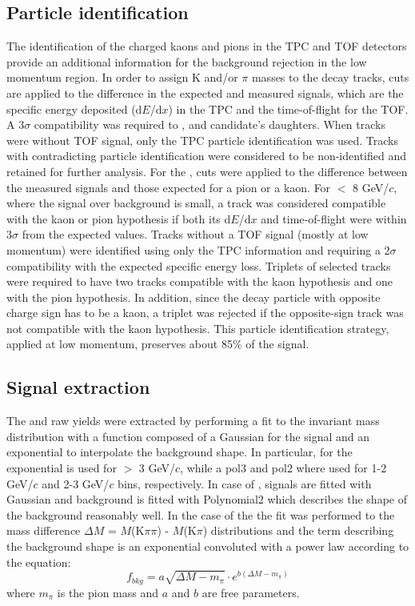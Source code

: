 \subsection{Particle identification}
\label{sec:pid_sel}
The identification of the charged kaons and pions in the TPC and TOF detectors provide an additional information for the background rejection in the low momentum region. In order to assign K and/or $\pi$ masses to the decay tracks, cuts are applied to the difference in the expected and measured signals, which are the specific energy deposited (d$E$/d$x$) in the TPC and the time-of-flight for the TOF. A 3$\sigma$ compatibility was required to \Dzero, \Dstar and \Dplus candidate's daughters. When tracks were without TOF signal, only the TPC particle identification was used. Tracks with contradicting particle identification were considered to be non-identified and retained for further analysis. 
For the \Dsubs, cuts were applied to the difference between the measured signals and those expected for a pion or a kaon. For \pt $<$ 8 GeV/$c$, where the signal over background is small, a track was considered compatible with the kaon or pion hypothesis if both its d$E$/d$x$ and time-of-flight were within 3$\sigma$ from the expected values. Tracks without a TOF signal (mostly at low momentum) were identified using only the TPC information and requiring a 2$\sigma$ compatibility with the expected specific energy loss. Triplets of selected tracks were required to have two tracks compatible with the kaon hypothesis and one with the pion hypothesis. In addition, since the decay particle with opposite charge sign has to be a kaon, a triplet was rejected if the opposite-sign track was not compatible with the kaon hypothesis. This particle identification strategy, applied at low momentum, preserves about 85$\%$ of the \Dsubs signal.

\subsection{Signal extraction}
\label{sec:sign_extr}
The \Dzero and \Dsubs raw yields were extracted by performing a fit to the invariant mass distribution with a function composed of a Gaussian for the signal and an exponential to interpolate the background shape. In particular, for \Dzero the exponential is used for \pt $>$ 3 GeV/$c$, while a pol3 and pol2 where used for 1-2 GeV/$c$ and 2-3 GeV/$c$ bins, respectively. In case of \Dplus, signals are fitted with Gaussian and background is fitted with Polynomial2 which describes the shape of the background reasonably well. In the case of the \Dstar the fit was performed to the mass difference $\Delta M$ = $M$(K$\pi\pi$) - $M$(K$\pi$) distributions and the term describing the background shape is an exponential convoluted with a power law according to the equation:
\begin{equation}
	f_{bkg} = a\sqrt{\Delta M - m_{\pi}}\cdot e^{b(\Delta M - m_{\pi})}
\end{equation}
where $m_{\pi}$ is the pion mass and $a$ and $b$ are free parameters.

